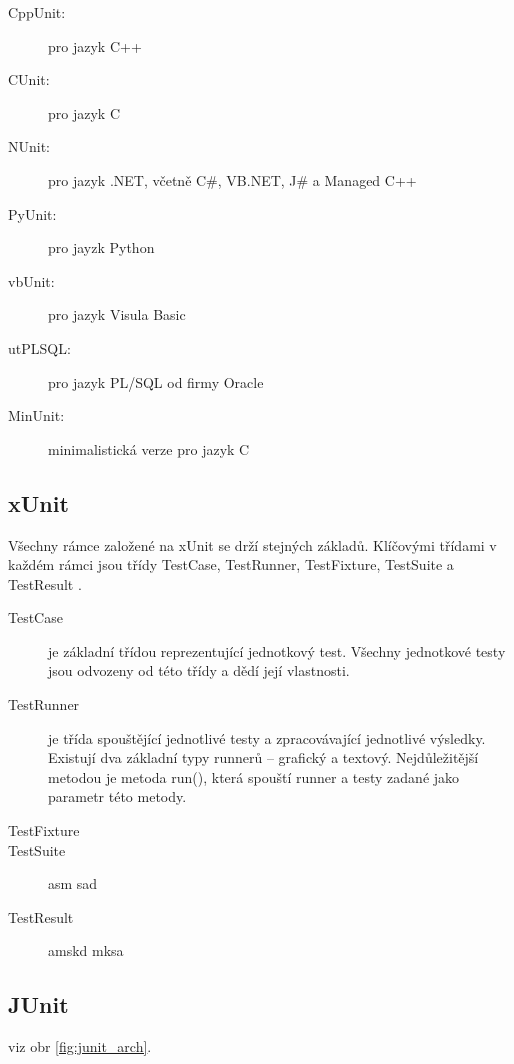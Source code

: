   \begin{description}
   \item[CppUnit:] pro jazyk C++
   \item[CUnit:] pro jazyk C
   \item[NUnit:] pro jazyk .NET, včetně C\#, VB.NET, J\# a Managed C++
   \item[PyUnit:] pro jayzk Python
   \item[vbUnit:] pro jazyk Visula Basic
   \item[utPLSQL:] pro jazyk PL/SQL od firmy Oracle
   \item[MinUnit:] minimalistická verze pro jazyk C
  \end{description}


    \subsection{xUnit}
    Všechny rámce založené na xUnit se drží stejných základů. Klíčovými třídami v každém rámci jsou třídy TestCase, TestRunner, TestFixture, TestSuite a TestResult \cite{UnitTestFrameworks}.

    \begin{description}
      \item[TestCase] je základní třídou reprezentující jednotkový test. Všechny jednotkové testy jsou odvozeny od této třídy a dědí její vlastnosti.
      \item[TestRunner] je třída spouštějící jednotlivé testy a zpracovávající jednotlivé výsledky. Existují dva základní typy runnerů -- grafický a textový. Nejdůležitější metodou je metoda run(), která spouští runner a testy zadané jako parametr této metody.
      \item[TestFixture] 
      \item[TestSuite] asm sad 
      \item[TestResult] amskd mksa 
    \end{description}


    \subsection{JUnit}
     viz obr \ref{fig:junit_arch}.

    
